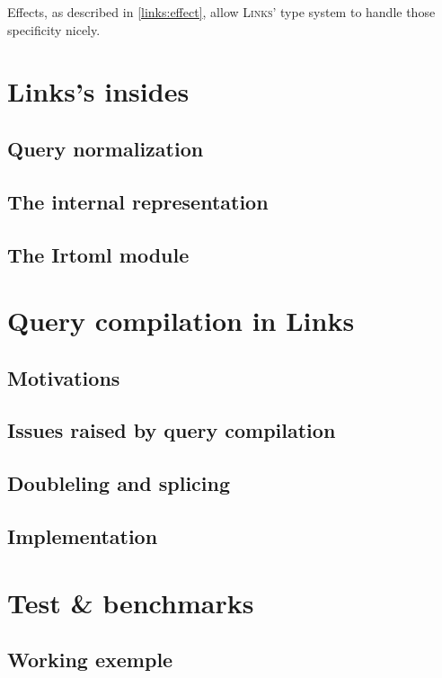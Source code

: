 \documentclass[11pt]{article}
\newcommand\mysc[1]{{\rmfamily\textsc{#1}}\xspace}
\newcommand\links{\mysc{Links}}
\begin{document}
Effects, as described in \ref{links:effect}, allow \links' type system to handle those specificity nicely.



\section{Links's insides}

\subsection{Query normalization}

\subsection{The internal representation}

\subsection{The Irtoml module}


\section{Query compilation in Links}

\subsection{Motivations}

\subsection{Issues raised by query compilation}

\subsection{Doubleling and splicing}

\subsection{Implementation}


\section{Test \& benchmarks}

\subsection{Working exemple}
\end{document}
